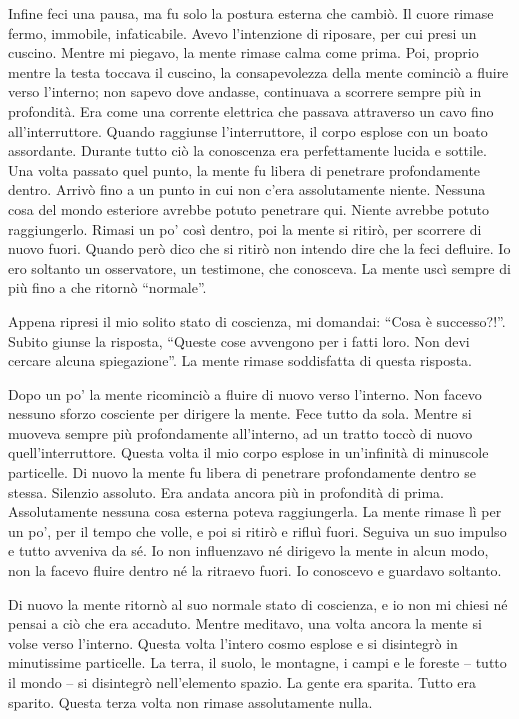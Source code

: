 Infine feci una pausa, ma fu solo la postura esterna che cambiò. Il
cuore rimase fermo, immobile, infaticabile. Avevo l'intenzione di
riposare, per cui presi un cuscino. Mentre mi piegavo, la mente rimase
calma come prima. Poi, proprio mentre la testa toccava il cuscino, la
consapevolezza della mente cominciò a fluire verso l'interno; non sapevo
dove andasse, continuava a scorrere sempre più in profondità. Era come
una corrente elettrica che passava attraverso un cavo fino
all'interruttore. Quando raggiunse l'interruttore, il corpo esplose con
un boato assordante. Durante tutto ciò la conoscenza era perfettamente
lucida e sottile. Una volta passato quel punto, la mente fu libera di
penetrare profondamente dentro. Arrivò fino a un punto in cui non c'era
assolutamente niente. Nessuna cosa del mondo esteriore avrebbe potuto
penetrare qui. Niente avrebbe potuto raggiungerlo. Rimasi un po' così
dentro, poi la mente si ritirò, per scorrere di nuovo fuori. Quando però
dico che si ritirò non intendo dire che la feci defluire. Io ero
soltanto un osservatore, un testimone, che conosceva. La mente uscì
sempre di più fino a che ritornò ``normale''.

Appena ripresi il mio solito stato di coscienza, mi domandai: ``Cosa è
successo?!''. Subito giunse la risposta, ``Queste cose avvengono per i
fatti loro. Non devi cercare alcuna spiegazione''. La mente rimase
soddisfatta di questa risposta.

Dopo un po' la mente ricominciò a fluire di nuovo verso l'interno. Non
facevo nessuno sforzo cosciente per dirigere la mente. Fece tutto da
sola. Mentre si muoveva sempre più profondamente all'interno, ad un
tratto toccò di nuovo quell'interruttore. Questa volta il mio corpo
esplose in un'infinità di minuscole particelle. Di nuovo la mente fu
libera di penetrare profondamente dentro se stessa. Silenzio assoluto.
Era andata ancora più in profondità di prima. Assolutamente nessuna cosa
esterna poteva raggiungerla. La mente rimase lì per un po', per il tempo
che volle, e poi si ritirò e rifluì fuori. Seguiva un suo impulso e
tutto avveniva da sé. Io non influenzavo né dirigevo la mente in alcun
modo, non la facevo fluire dentro né la ritraevo fuori. Io conoscevo e
guardavo soltanto.

Di nuovo la mente ritornò al suo normale stato di coscienza, e io non mi
chiesi né pensai a ciò che era accaduto. Mentre meditavo, una volta
ancora la mente si volse verso l'interno. Questa volta l'intero cosmo
esplose e si disintegrò in minutissime particelle. La terra, il suolo,
le montagne, i campi e le foreste -- tutto il mondo -- si disintegrò
nell'elemento spazio. La gente era sparita. Tutto era sparito. Questa
terza volta non rimase assolutamente nulla.

